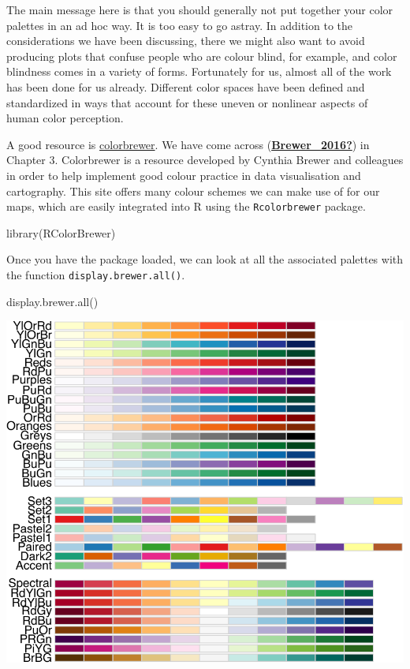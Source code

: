\documentclass[
]{book}
\newenvironment{Shaded}{\begin{snugshade}}{\end{snugshade}}
\newcommand{\FunctionTok}[1]{\textcolor[rgb]{0.00,0.00,0.00}{#1}}
\newcommand{\NormalTok}[1]{#1}
\begin{document}
The main message here is that you should generally not put together your color palettes in an ad hoc way. It is too easy to go astray. In addition to the considerations we have been discussing, there we might also want to avoid producing plots that confuse people who are colour blind, for example, and color blindness comes in a variety of forms. Fortunately for us, almost all of the work has been done for us already. Different color spaces have been defined and standardized in ways that account for these uneven or nonlinear aspects of human color perception.

A good resource is \href{http://colorbrewer2.org/}{colorbrewer}. We have come across (\protect\hyperlink{ref-Brewer_2016}{\textbf{Brewer\_2016?}}) in Chapter 3. Colorbrewer is a resource developed by Cynthia Brewer and colleagues in order to help implement good colour practice in data visualisation and cartography. This site offers many colour schemes we can make use of for our maps, which are easily integrated into R using the \texttt{Rcolorbrewer} package.

\begin{Shaded}
\begin{Highlighting}[]
\FunctionTok{library}\NormalTok{(RColorBrewer)}
\end{Highlighting}
\end{Shaded}

Once you have the package loaded, we can look at all the associated palettes with the function \texttt{display.brewer.all()}.

\begin{Shaded}
\begin{Highlighting}[]
\FunctionTok{display.brewer.all}\NormalTok{()}
\end{Highlighting}
\end{Shaded}

\includegraphics{crime_mapping_files/figure-latex/dsplayallcolourbrewerpallettes-1.pdf}
\end{document}

